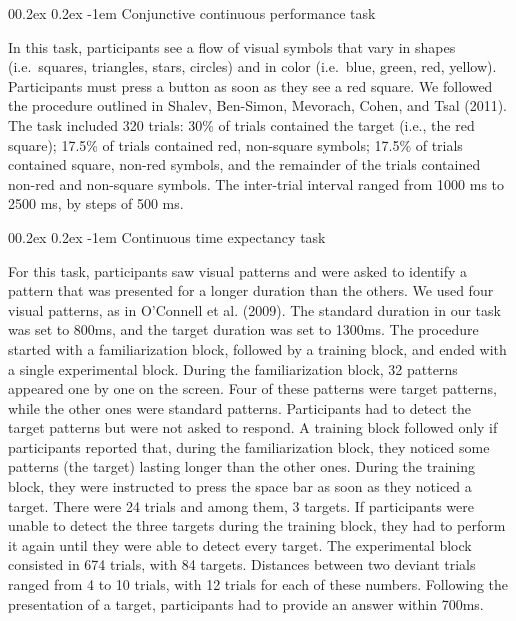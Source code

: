 \documentclass[
  man,floatsintext]{apa6}
\makeatletter
\let\oldparagraph\paragraph
\renewcommand{\paragraph}[1]{\oldparagraph{#1}\mbox{}}
\renewcommand{\paragraph}{\@startsection{paragraph}{4}{\parindent}%
  {0\baselineskip \@plus 0.2ex \@minus 0.2ex}%
  {-1em}%
  {\normalfont\normalsize\bfseries\itshape\typesectitle}}
\makeatother
\begin{document}
\hypertarget{conjunctive-continuous-performance-task}{%
\paragraph{Conjunctive continuous performance task}\label{conjunctive-continuous-performance-task}}

In this task, participants see a flow of visual symbols that vary in shapes (i.e.~squares, triangles, stars, circles) and in color (i.e.~blue, green, red, yellow). Participants must press a button as soon as they see a red square. We followed the procedure outlined in Shalev, Ben-Simon, Mevorach, Cohen, and Tsal (2011). The task included 320 trials: 30\% of trials contained the target (i.e., the red square); 17.5\% of trials contained red, non-square symbols; 17.5\% of trials contained square, non-red symbols, and the remainder of the trials contained non-red and non-square symbols. The inter-trial interval ranged from 1000 ms to 2500 ms, by steps of 500 ms.

\hypertarget{continuous-time-expectancy-task}{%
\paragraph{Continuous time expectancy task}\label{continuous-time-expectancy-task}}

For this task, participants saw visual patterns and were asked to identify a pattern that was presented for a longer duration than the others. We used four visual patterns, as in O'Connell et al. (2009). The standard duration in our task was set to 800ms, and the target duration was set to 1300ms. The procedure started with a familiarization block, followed by a training block, and ended with a single experimental block. During the familiarization block, 32 patterns appeared one by one on the screen. Four of these patterns were target patterns, while the other ones were standard patterns. Participants had to detect the target patterns but were not asked to respond. A training block followed only if participants reported that, during the familiarization block, they noticed some patterns (the target) lasting longer than the other ones. During the training block, they were instructed to press the space bar as soon as they noticed a target. There were 24 trials and among them, 3 targets. If participants were unable to detect the three targets during the training block, they had to perform it again until they were able to detect every target. The experimental block consisted in 674 trials, with 84 targets. Distances between two deviant trials ranged from 4 to 10 trials, with 12 trials for each of these numbers. Following the presentation of a target, participants had to provide an answer within 700ms.
\end{document}

